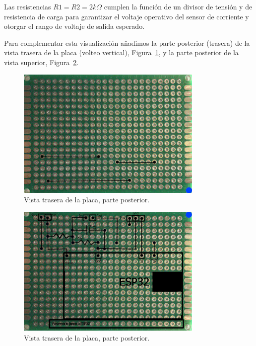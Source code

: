 \documentclass[a4paper,10pt]{article}
\begin{document}
Las resistencias $R1=R2=2k\Omega$ cumplen la función de un divisor de
tensión y de resistencia de carga para garantizar el voltaje operativo
del sensor de corriente y otorgar el rango de voltaje de salida esperado.

Para complementar esta visualización añadimos la parte posterior (trasera) de la
vista trasera de la placa (volteo vertical), Figura~\ref{fig:placa-tras-inf},
y la parte posterior de la vista superior, Figura~\ref{fig:placa-sup-inf}.

\begin{figure}
  \centering
  \includegraphics[width=0.8\textwidth]{img/dibujo_placa_vista_inferior_parte_trasera.png}
  \caption{Vista trasera de la placa, parte posterior.}\label{fig:placa-tras-inf}
\end{figure}

\begin{figure}
  \centering
  \includegraphics[width=0.8\textwidth]{img/dibujo_placa_vista_superior_parte_trasera.png}
  \caption{Vista trasera de la placa, parte posterior.}\label{fig:placa-sup-inf}
\end{figure}
\end{document}
